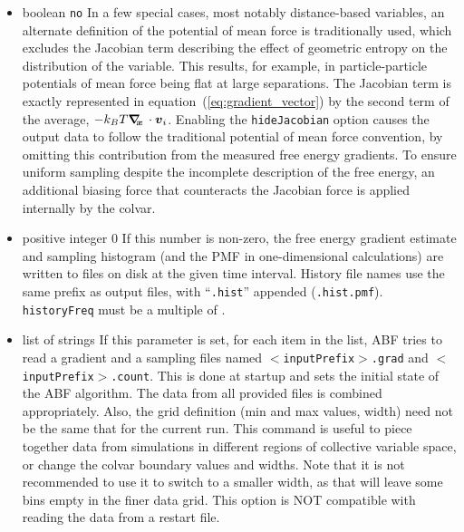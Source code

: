 \begin{itemize}
\item {}
  {boolean}
  {\texttt{no}}
  {In a few special cases, most notably distance-based variables, an alternate definition of
    the potential of mean force is traditionally used, which excludes the Jacobian
    term describing the effect of geometric entropy on the distribution of the variable.
    This results, for example, in particle-particle potentials of mean force being flat
    at large separations.
    The Jacobian term is exactly represented in equation~(\ref{eq:gradient_vector}) by the second term
    of the average, $ - k_B T \mbox{\boldmath$\nabla_{\!\!x}\,$} \cdot {\mbox{\boldmath{$v$}}}_{i} $.
    Enabling the \texttt{hideJacobian} option causes the output data to follow the traditional
    potential of mean force convention,
    by omitting this contribution from the measured free energy gradients.
    To ensure uniform sampling despite the incomplete description of the free energy, an
    additional biasing force that counteracts the Jacobian force is applied internally by the
    colvar.}

\item {}
  {positive integer}
  {0}
  {If this number is non-zero, the free energy gradient estimate and sampling histogram
    (and the PMF in one-dimensional calculations) are written to files on disk at
    the given time interval. History file names use the same prefix as output files, with
    ``\texttt{.hist}'' appended (\outputName\texttt{.hist.pmf}).
  \texttt{historyFreq} must be a multiple of .}

\item {}
  {list of strings}
  {If this parameter is set, for each item in the list, ABF tries to read
    a gradient and a sampling files named \texttt{$<$inputPrefix$>$.grad}
    and \texttt{$<$inputPrefix$>$.count}. This is done at
    startup and sets the initial state of the ABF algorithm.
    The data from all provided files is combined appropriately.
    Also, the grid definition (min and max values, width) need not be the same
    that for the current run. This command is useful to piece together
    data from simulations in different regions of collective variable space,
    or change the colvar boundary values and widths. Note that it is not
    recommended to use it to switch to a smaller width, as that will leave
    some bins empty in the finer data grid.
    This option is NOT compatible with reading the data from a restart file.}


\end{itemize}
